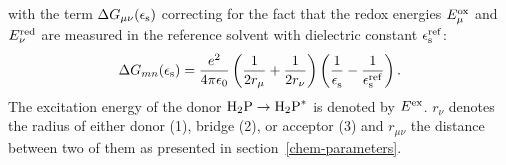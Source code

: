 \documentclass[12pt,twoside,a4paper]{report}
\begin{document}
 with the  term $\Delta G_{\mu \nu}(\epsilon_{\rm s})$ 
correcting for the fact that the redox energies $E^{\rm ox}_\mu$ and $E^{\rm red}_\nu$ are measured 
in the reference solvent with dielectric constant $\epsilon_{\rm s}^{\rm ref}$: 
 \begin{equation}
   \label{2a}
   \Delta 
     G_{mn}
     (\epsilon
      _{\rm s})
                 = 
                    \frac
                        {e^2}
                        {4 \pi \epsilon_0} 
                    \left(
                        \frac
                            1
                            {2r_\mu}
                      + \frac
                            1
                            {2r_\nu} 
                   \right) 
                   \left( 
                       \frac
                           1
                           {\epsilon_{\rm s}^{\rm }} 
                    -  \frac
                           1
                           {\epsilon_{\rm s}^{\rm ref}} 
                   \right).
 \end{equation}
 The excitation energy of the donor ${\rm H_2P} \to {\rm H_2P}^*$ is
 denoted by $E^{\rm ex}$. $r_\nu$ denotes the radius of
either donor (1), bridge (2), or acceptor (3) 
 and $r_{\mu \nu}$ the distance between two of them
as presented in section~\ref{chem-parameters}. 
\end{document}
